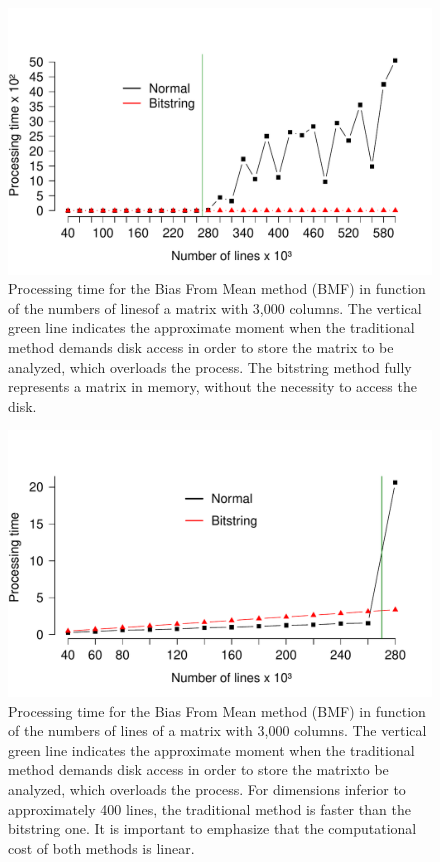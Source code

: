 \documentclass[10pt]{article}
\begin{document}
\begin{figure}[h]
  \centering
  \includegraphics[scale=0.6,clip]{fig42}
  \caption{Processing time for the Bias From Mean method (BMF) in function of the numbers of linesof a matrix 
  with 3,000 columns. The vertical green line indicates the approximate moment when the traditional method  
  demands  disk access in order to store the matrix to be analyzed, which  overloads the process. The bitstring 
  method fully represents a matrix  in memory, without the necessity to access the  disk.}
  \label{fig42}
\end{figure}

\begin{figure}[h]
  \centering
  \includegraphics[scale=0.6,clip]{fig43}
  \caption{Processing time for the Bias From Mean method (BMF) in function of the  numbers of lines of a matrix 
  with 3,000 columns.  The vertical green line indicates the approximate moment when the traditional method  
  demands disk access in order to store the matrixto be analyzed, which  overloads the process. For dimensions 
  inferior to approximately 400 lines, the traditional method is faster than the bitstring one. It is important 
  to emphasize that the computational cost of both methods is linear.}
  \label{fig43}
\end{figure}
\end{document}
